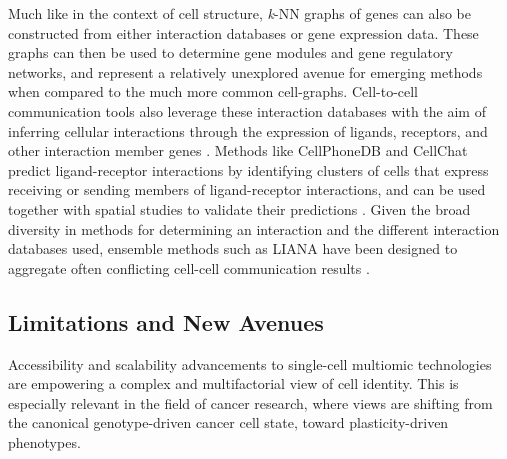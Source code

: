 Much like in the context of cell structure, \emph{k}-NN graphs of genes can also be constructed from either interaction databases or gene expression data. These graphs can then be used to determine gene modules and gene regulatory networks, and represent a relatively unexplored avenue for emerging methods when compared to the much more common cell-graphs.
Cell-to-cell communication tools also leverage these interaction databases with the aim of inferring cellular interactions through the expression of ligands, receptors, and other interaction member genes \cite{armingol_deciphering_2020}. Methods like CellPhoneDB \cite{efremova_cellphonedb_2020} and CellChat \cite{jin_inference_2021} predict ligand-receptor interactions by identifying clusters of cells that express receiving or sending members of ligand-receptor interactions, and can be used together with spatial studies to validate their predictions \cite{hu_cytotalk_2021,kanemaru_spatially_2023}. Given the broad diversity in methods for determining an interaction and the different interaction databases used, ensemble methods such as LIANA have been designed to aggregate often conflicting cell-cell communication results \cite{dimitrov_comparison_2022, baghdassarian_combining_2023}. 


\subsection{Limitations and New Avenues}

Accessibility and scalability advancements to single-cell multiomic technologies are empowering a complex and multifactorial view of cell identity. This is especially relevant in the field of cancer research, where views are shifting from the canonical genotype-driven cancer cell state, toward plasticity-driven phenotypes. 

